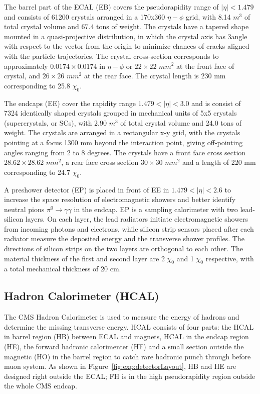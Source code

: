 The barrel part of the ECAL (EB) covers the pseudorapidity range of $|\eta|< 1.479$ and consists of 61200 crystals arranged in a 170x360 $\eta - \phi$ grid, with 8.14 $m^3$ of total crystal volume and 67.4 tons of weight. The crystals have a tapered shape mounted in a quasi-projective distribution, in which the crystal axis has 3\degree angle with respect to the vector from the origin to minimize chances of cracks aligned with the particle trajectories. The crystal cross-section corresponds to approximately $0.0174 \times 0.0174$ in $\eta - \phi$ or $22 \times 22$ $mm^2$ at the front face of crystal, and $26\times26$ $mm^2$ at the rear face. The crystal length is 230 mm corresponding to 25.8 $\chi_0$.

The endcaps (EE) cover the rapidity range $1.479 < |\eta| < 3.0$ and is consist of 7324 identically shaped crystals grouped in mechanical units of 5x5 crystals (supercrystals, or SCs), with 2.90 $m^3$ of total crystal volume and 24.0 tons of weight. The crystals are arranged in a rectangular x-y grid, with the crystals pointing at a focus 1300 mm beyond the interaction point, giving off-pointing angles ranging from 2 to 8 degrees. The crystals have a front face cross section $28.62\times28.62$ $mm^2$, a rear face cross section $30\times30$ $mm^2$ and a length of 220 mm corresponding to 24.7 $\chi_0$.

A preshower detector (EP) is placed in front of EE in $1.479 < |\eta| < 2.6$ to increase the space resolution of electromagnetic showers and better identify neutral pions $\pi^0 \to \gamma \gamma$ in the endcap. EP is a sampling calorimeter with two lead-silicon layers. On each layer, the lead radiators initiate electromagnetic showers from incoming photons and electrons, while silicon strip sensors placed after each radiator measure the deposited energy and the transverse shower profiles. The directions of silicon strips on the two layers are orthogonal to each other. The material thickness of the first and second layer are 2 $\chi_0$ and 1 $\chi_0$ respective, with a total mechanical thickness of 20 cm.



\subsection{Hadron Calorimeter (HCAL)}
The CMS Hadron Calorimeter \cite{cms:hcalTdrCMS:1997xji} is used to measure the energy of hadrons and determine the missing transverse energy. HCAL consists of four parts: the HCAL in barrel region (HB) between ECAL and magnets, HCAL in the endcap region (HE), the forward hadronic calorimenter (HF) and a small section outside the magnetic (HO) in the barrel region to catch rare hadronic punch through before muon system. As shown in Figure~\ref{fig:exp:detectorLayout}, HB and HE are designed right outside the ECAL; FH is in the high pseudorapidity region outside the whole CMS endcap.

